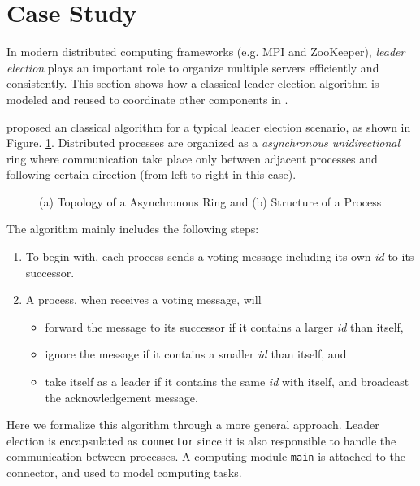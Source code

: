 \section{Case Study}
\label{sec:casestudy}

In modern distributed computing frameworks (e.g. MPI and ZooKeeper), \emph{leader election} plays an important role to organize multiple servers efficiently and consistently. This section shows how a classical leader election algorithm is modeled and reused to coordinate other components in \lang{}.

  \cite{HagitDistributed2004} proposed an classical algorithm for a typical leader election scenario, as shown in Figure. \ref{fig:leaderelection}. Distributed processes are organized as a \emph{asynchronous unidirectional} ring where communication take place only between adjacent processes and following certain direction (from left to right in this case).

\begin{figure}
	\centering
	\resizebox{.8\textwidth}{!}{
        
    }
	\caption{(a) Topology of a Asynchronous Ring and (b) Structure of a Process}
	\label{fig:leaderelection}
\end{figure}

The algorithm mainly includes the following steps:
\begin{enumerate}
	\item To begin with, each process sends a voting message including its own \emph{id} to its successor.
	\item A process, when receives a voting message, will
	\begin{itemize}
		\item forward the message to its successor if it contains a larger \emph{id} than itself,
		\item ignore the message if it contains a smaller \emph{id} than itself, and
		\item take itself as a leader if it contains the same \emph{id} with itself, and broadcast the acknowledgement message.
	\end{itemize} 
\end{enumerate}

Here we formalize this algorithm through a more general approach. Leader election is encapsulated as \texttt{connector} since it is also responsible to handle the communication between processes. A computing module \texttt{main} is attached to the connector, and used to model computing tasks. 


